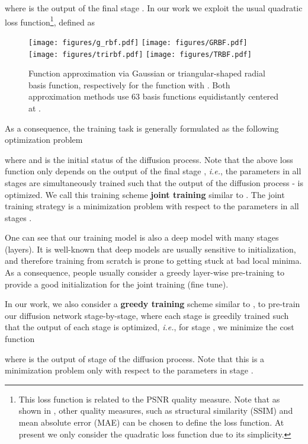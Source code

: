 \documentclass[10pt,journal,compsoc]{IEEEtran}
\newcommand{\ie}{\emph{i.e.}}
\begin{document}
where  is the output of the final stage . In our work we exploit 
the usual quadratic loss function\footnote{
This loss function is related to the PSNR quality measure. Note that as shown in \cite{ECCV2012RTF}, other 
quality measures, such as structural similarity (SSIM) and mean absolute error (MAE) can be chosen to define the loss function.
At present we only consider the quadratic loss function due to its simplicity.}, 
defined as


\begin{figure*}[t!]
\centering
\texttt{[image: figures/g\_rbf.pdf]}
\texttt{[image: figures/GRBF.pdf]}
\texttt{[image: figures/trirbf.pdf]}
\texttt{[image: figures/TRBF.pdf]}
\caption{Function approximation via Gaussian  or 
triangular-shaped  radial basis function, respectively for the function  with . Both approximation methods use 63 basis functions equidistantly centered at .}\label{mapping}
\vspace{-0.4cm}
\end{figure*}

As a consequence, the training task is generally formulated as the following 
optimization problem

where  and  is the initial status of 
the diffusion process.
Note that the above loss function only depends on the output of the final 
stage , \ie, the parameters in all stages are 
simultaneously trained such that the output of the diffusion process -   is optimized. {
We call this training scheme \textbf{joint training} similar to \cite{CSF2014}. }
The joint training strategy is a minimization problem with respect to 
the parameters in all stages . 


One can see that our training model is also 
a deep model with many stages (layers). It is well-known that deep models are usually sensitive to initialization, 
and therefore training from scratch is prone to getting stuck at bad local minima. As a consequence, 
people usually consider a greedy layer-wise pre-training \cite{bengio2007greedy} to provide a good 
initialization for the joint training (fine tune). 

{
In our work, we also consider a \textbf{greedy training} scheme similar to 
\cite{CSF2014},} to pre-train our diffusion network stage-by-stage, where 
each stage is greedily trained such that the output of each stage is optimized, \ie, for stage , we minimize the 
cost function

where  is the output of stage  of the diffusion process. Note that this is a minimization problem only 
with respect to the parameters  in stage . 
\end{document}
